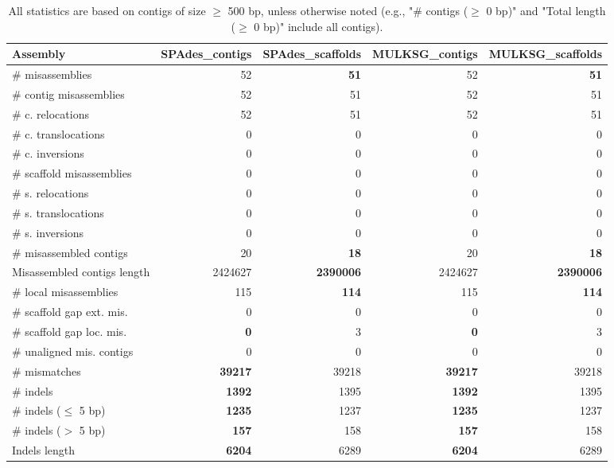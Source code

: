 \documentclass[12pt,a4paper]{article}
\begin{document}
\begin{table}[ht]
\begin{center}
\caption{All statistics are based on contigs of size $\geq$ 500 bp, unless otherwise noted (e.g., "\# contigs ($\geq$ 0 bp)" and "Total length ($\geq$ 0 bp)" include all contigs).}
\begin{tabular}{|l*{4}{|r}|}
\hline
Assembly & SPAdes\_contigs & SPAdes\_scaffolds & MULKSG\_contigs & MULKSG\_scaffolds \\ \hline
\# misassemblies & 52 & {\bf 51} & 52 & {\bf 51} \\ \hline
\hspace{2mm}\# contig misassemblies & 52 & 51 & 52 & 51 \\ \hline
\hspace{5mm}\# c. relocations & 52 & 51 & 52 & 51 \\ \hline
\hspace{5mm}\# c. translocations & 0 & 0 & 0 & 0 \\ \hline
\hspace{5mm}\# c. inversions & 0 & 0 & 0 & 0 \\ \hline
\hspace{2mm}\# scaffold misassemblies & 0 & 0 & 0 & 0 \\ \hline
\hspace{5mm}\# s. relocations & 0 & 0 & 0 & 0 \\ \hline
\hspace{5mm}\# s. translocations & 0 & 0 & 0 & 0 \\ \hline
\hspace{5mm}\# s. inversions & 0 & 0 & 0 & 0 \\ \hline
\# misassembled contigs & 20 & {\bf 18} & 20 & {\bf 18} \\ \hline
Misassembled contigs length & 2424627 & {\bf 2390006} & 2424627 & {\bf 2390006} \\ \hline
\# local misassemblies & 115 & {\bf 114} & 115 & {\bf 114} \\ \hline
\# scaffold gap ext. mis. & 0 & 0 & 0 & 0 \\ \hline
\# scaffold gap loc. mis. & {\bf 0} & 3 & {\bf 0} & 3 \\ \hline
\# unaligned mis. contigs & 0 & 0 & 0 & 0 \\ \hline
\# mismatches & {\bf 39217} & 39218 & {\bf 39217} & 39218 \\ \hline
\# indels & {\bf 1392} & 1395 & {\bf 1392} & 1395 \\ \hline
\hspace{5mm}\# indels ($\leq$ 5 bp) & {\bf 1235} & 1237 & {\bf 1235} & 1237 \\ \hline
\hspace{5mm}\# indels ($>$ 5 bp) & {\bf 157} & 158 & {\bf 157} & 158 \\ \hline
Indels length & {\bf 6204} & 6289 & {\bf 6204} & 6289 \\ \hline
\end{tabular}
\end{center}
\end{table}
\end{document}

